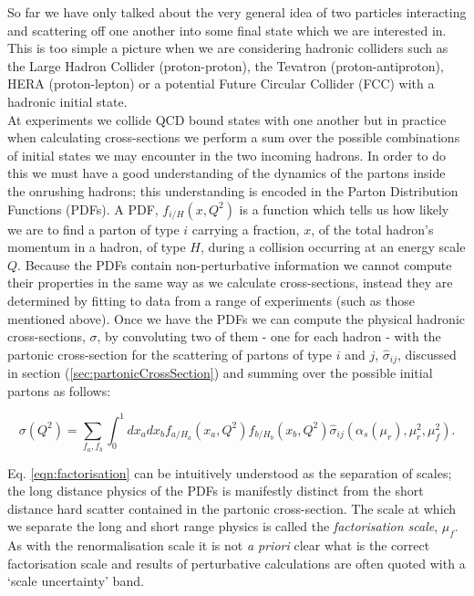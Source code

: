 	So far we have only talked about the very general idea of two particles interacting and scattering off one another into
	some final state which we are interested in.  This is too simple a picture when we are considering hadronic colliders
	such as the Large Hadron Collider (proton-proton), the Tevatron (proton-antiproton), HERA (proton-lepton) or a potential
	Future Circular Collider (FCC) with a hadronic initial state.\\At experiments we collide QCD bound states with one another
	but in practice when calculating cross-sections we perform a sum over the possible combinations of initial states we may
	encounter in the two incoming hadrons.  In order to do this we must have a good understanding of the dynamics of the partons
	inside the onrushing hadrons; this understanding is encoded in the Parton Distribution Functions (PDFs).  A PDF,
	$f_{i/H}(x, Q^2)$ is a function which tells us how likely we are to find a parton of type $i$ carrying a fraction, $x$, of the
	total hadron's momentum in a hadron, of type $H$, during a collision occurring at an energy scale $Q$.  Because the PDFs contain
	non-perturbative information we cannot compute their properties in the same way as we calculate cross-sections, instead they
	are determined by fitting to data from a range of experiments (such as those mentioned above).  Once we have the
	PDFs we can compute the physical hadronic cross-sections, $\sigma$, by convoluting two of them - one for each hadron - with
	the partonic cross-section for the scattering of partons of type $i$ and $j$, $\hat{\sigma}_{ij}$, discussed in section
	(\ref{sec:partonicCrossSection}) and summing over the possible initial partons as follows:

	\begin{equation}
		\sigma(Q^2) = \sum_{f_a,f_b}\int_0^1dx_adx_bf_{a/H_a}(x_a, Q^2)f_{b/H_b}(x_b, Q^2)\hat{\sigma}_{ij}(\alpha_s(\mu_r), \mu_r^2, \mu_f^2).
		\label{eqn:factorisation}
	\end{equation}

	Eq. \eqref{eqn:factorisation} can be intuitively understood as the separation of scales; the long distance physics of the PDFs is
	manifestly distinct from the short distance hard scatter contained in the partonic cross-section.  The scale at which we separate the
	long and short range physics is called the \emph{factorisation scale}, $\mu_f$.  As with the renormalisation scale it is not
	\emph{a priori} clear what is the correct factorisation scale and results of perturbative calculations are often quoted with
	a `scale uncertainty' band.

